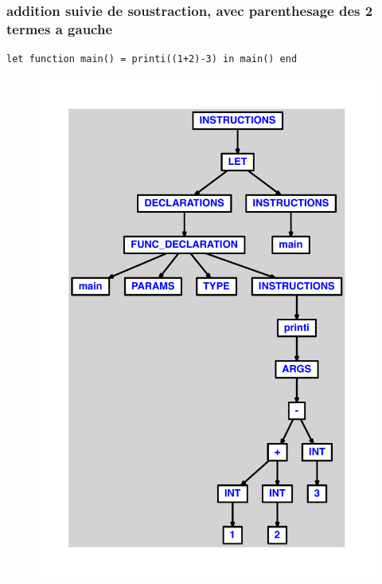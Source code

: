 \documentclass{article}
\begin{document}
\subsubsection{addition suivie de soustraction, avec parenthesage des 2 termes a gauche}
\begin{lstlisting}
let function main() = printi((1+2)-3) in main() end
\end{lstlisting}
\newpage
\begin{figure}[H]
\centering
\includegraphics[max width=\textwidth]{ast/ast_96.pdf}
\end{figure}
\newpage
\end{document}
